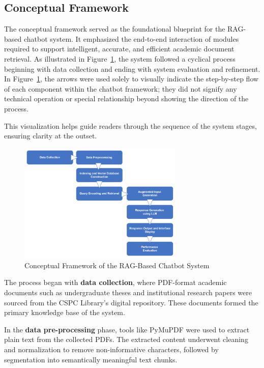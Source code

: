\begin{refsection}
\section{Conceptual Framework}

The conceptual framework served as the foundational blueprint for the RAG-based chatbot system. It emphasized the end-to-end interaction of modules required to support intelligent, accurate, and efficient academic document retrieval. As illustrated in Figure~\ref{fig:conceptual_framework}, the system followed a cyclical process beginning with data collection and ending with system evaluation and refinement.
In Figure~\ref{fig:conceptual_framework}, the arrows were used solely to visually indicate the step-by-step flow of each component within the chatbot framework; they did not signify any technical operation or special relationship beyond showing the direction of the process. 

This visualization helps guide readers through the sequence of the system stages, ensuring clarity at the outset.

\begin{figure}[H]
    \centering
    \includegraphics[width=0.7\textwidth]{figures/framework.png}
    \caption{Conceptual Framework of the RAG-Based Chatbot System}
    \label{fig:conceptual_framework}
\end{figure}

The process began with \textbf{data collection}, where PDF-format academic documents such as undergraduate theses and institutional research papers were sourced from the CSPC Library’s digital repository. These documents formed the primary knowledge base of the system.

In the \textbf{data pre-processing} phase, tools like PyMuPDF were used to extract plain text from the collected PDFs. The extracted content underwent cleaning and normalization to remove non-informative characters, followed by segmentation into semantically meaningful text chunks.


\end{refsection}
